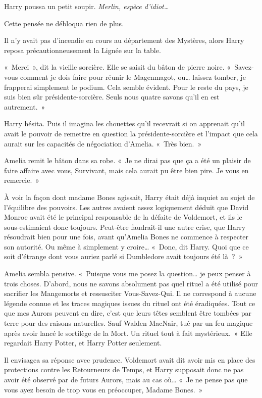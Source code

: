 Harry poussa un petit soupir. \emph{Merlin, espèce d'idiot…}

Cette pensée ne débloqua rien de plus.

Il n'y avait pas d'incendie en cours au département des Mystères, alors Harry reposa précautionneusement la Lignée sur la table.

«~Merci~», dit la vieille sorcière. Elle se saisit du bâton de pierre noire. «~Savez-vous comment je dois faire pour réunir le Magenmagot, ou… laissez tomber, je frapperai simplement le podium. Cela semble évident. Pour le reste du pays, je suis bien sûr présidente-sorcière. Seuls nous quatre savons qu'il en est autrement.~»

Harry hésita. Puis il imagina les chouettes qu'il recevrait si on apprenait qu'il avait le pouvoir de remettre en question la présidente-sorcière et l'impact que cela aurait sur les capacités de négociation d'Amelia. «~Très bien.~»

Amelia remit le bâton dans sa robe. «~Je ne dirai pas que ça a été un plaisir de faire affaire avec vous, Survivant, mais cela aurait pu être bien pire. Je vous en remercie.~»

À voir la façon dont madame Bones agissait, Harry était déjà inquiet au sujet de l'équilibre des pouvoirs. Les autres avaient assez logiquement déduit que David Monroe avait été le principal responsable de la défaite de Voldemort, et ils le sous-estimaient donc toujours. Peut-être faudrait-il une autre crise, que Harry résoudrait bien pour une fois, avant qu'Amelia Bones ne commence à respecter son autorité. Ou même à simplement y croire… «~Donc, dit Harry. Quoi que ce soit d'étrange dont vous auriez parlé si Dumbledore avait toujours été là~?~»

Amelia sembla pensive. «~Puisque vous me posez la question… je peux penser à trois choses. D'abord, nous ne savons absolument pas quel rituel a été utilisé pour sacrifier les Mangemorts et ressusciter Vous-Savez-Qui. Il ne correspond à aucune légende connue et les traces magiques issues du rituel ont été éradiquées. Tout ce que mes Aurors peuvent en dire, c'est que leurs têtes semblent être tombées par terre pour des raisons naturelles. Sauf Walden MacNair, tué par un feu magique après avoir lancé le sortilège de la Mort. Un rituel tout à fait mystérieux.~» Elle regardait Harry Potter, et Harry Potter seulement.

Il envisagea sa réponse avec prudence. Voldemort avait dit avoir mis en place des protections contre les Retourneurs de Temps, et Harry supposait donc ne pas avoir été observé par de futurs Aurors, mais au cas où… «~Je ne pense pas que vous ayez besoin de trop vous en préoccuper, Madame Bones.~»

